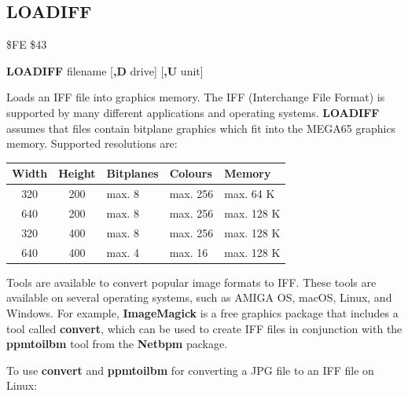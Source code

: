 
\newpage
\subsection{LOADIFF}
\begin{description}[leftmargin=2cm,style=nextline]
\item [Token:] \$FE \$43
\item [Format:] {\bf LOADIFF} filename [{\bf,D} drive] [{\bf,U} unit]
\item [Usage:]

   Loads an IFF file into graphics memory.
   The IFF (Interchange File Format) is supported by many different applications
   and operating systems. {\bf LOADIFF} assumes that files
   contain bitplane graphics which fit into the MEGA65 graphics memory.
   Supported resolutions are:
\begin{center}
\setlength{\tabcolsep}{1mm}
\begin{tabular}{|c|c|l|l|l|}
\hline
{\bf Width}             & {\bf Height} & {\bf Bitplanes} & {\bf Colours} & {\bf Memory} \\
\hline
320                     &  200    & max. 8     & max. 256 & max. 64 K \\
640                     &  200    & max. 8     & max. 256 & max. 128 K \\
320                     &  400    & max. 8     & max. 256 & max. 128 K \\
640                     &  400    & max. 4     & max.  16 & max. 128 K \\
\hline
\end{tabular}
\end{center}

   \filenamedefinition

   \drivedefinition

   \unitdefinition

\item [Remarks:]
   Tools are available to convert popular image formats to IFF. These tools
   are available on several operating systems, such as AMIGA OS, macOS, Linux, and Windows.
   For example, {\bf ImageMagick} is a free graphics package that includes a tool
   called {\bf convert}, which can be used to create IFF files in conjunction
   with the {\bf ppmtoilbm} tool from the {\bf Netbpm} package.

To use {\bf convert} and {\bf ppmtoilbm} for converting a JPG file to an IFF file on Linux:


\end{description}
